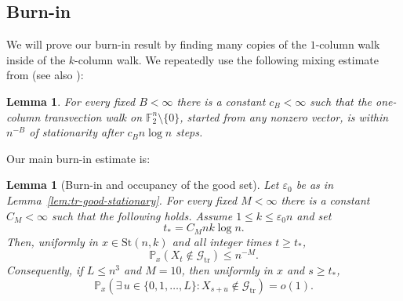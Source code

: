 \documentclass[11pt, reqno]{amsart}
\numberwithin{equation}{section}
\newtheorem{lemma}[theorem]{Lemma}
\newcommand{\Ft}{\mathbb F_2}
\newcommand{\Stief}[2]{\mathrm{St}(#1,#2)}
\newcommand{\Prob}{\mathbb P}
\newcommand{\Good}{\mathcal G}
\begin{document}
\subsection{Burn-in}\label{subsec:transvection-burnin}

We will prove our burn-in result by finding many copies of the $1$-column walk inside of the $k$-column walk. We repeatedly use the following mixing estimate from \cite[Theorem~1.1]{PeresTanakaZhai2020} (see also \cite[Theorem~1]{BenHamouPeres2018}):

\begin{lemma}\label{lem:tr-one-column-input}
For every fixed \(B<\infty\) there is a constant \(c_B<\infty\) such that the
one-column transvection walk on \(\Ft^n\setminus\{0\}\), started from any nonzero
vector, is within \(n^{-B}\) of stationarity after \(c_Bn\log n\) steps.
\end{lemma}

Our main burn-in estimate is: 

\begin{lemma}[Burn-in and occupancy of the good set]\label{lem:tr-burnin}
Let \(\varepsilon_0\) be as in Lemma~\ref{lem:tr-good-stationary}.  For every
fixed \(M<\infty\) there is a constant \(C_M<\infty\) such that the following
holds.  Assume \(1\le k\le\varepsilon_0 n\) and set
\begin{equation}\label{eq:tr-tstar}
    t_*=C_M nk\log n.
\end{equation}
Then, uniformly in \(x\in\Stief{n}{k}\) and all integer times
\(t\ge t_*\),
\begin{equation}\label{eq:tr-burnin-one-time}
    \Prob_x(X_t\notin\Good_{\mathrm{tr}})\le n^{-M}.
\end{equation}
Consequently, if \(L\le n^3\) and \(M=10\), then uniformly in \(x\) and
\(s\ge t_*\),
\begin{equation}\label{eq:tr-sojourn}
    \Prob_x(\exists\,u\in\{0,1,\ldots,L\}:X_{s+u}\notin\Good_{\mathrm{tr}})=o(1).
\end{equation}
\end{lemma}
\end{document}
